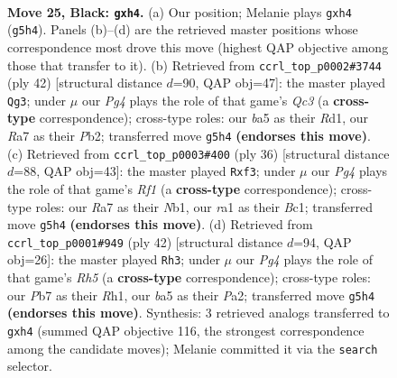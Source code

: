 \documentclass[11pt]{article}
\begin{document}
\clearpage

\begin{figure}[p]\centering
\begin{subfigure}{0.46\textwidth}\centering
\resizebox{\linewidth}{!}{%
\newchessgame
\chessboard[
  setfen={1Nr5/rp2bpk1/p3p3/B5p1/4q2N/4P3/PP3PPP/R2QR1K1 b - - 0 25},
  showmover=false,
  pgfstyle=straightmove, color=movearrow, markmove={g5-h4}
]}
\caption{}
\end{subfigure}\hfill
\begin{subfigure}{0.46\textwidth}\centering
\resizebox{\linewidth}{!}{%
\newchessgame
\chessboard[
  setfen={r2q1rk1/3b1ppp/1p1p4/1N6/p1P2R2/PnQ5/1P2B1PP/3R2K1 w - - 0 22},
  showmover=false,
  pgfstyle=straightmove, color=movearrow, markmove={c3-g3}
]}
\caption{}
\end{subfigure}
\\[4pt]
\begin{subfigure}{0.46\textwidth}\centering
\resizebox{\linewidth}{!}{%
\newchessgame
\chessboard[
  setfen={r2q1rk1/pp4np/3pb1p1/8/2PQPP2/5p2/PP5P/RNB2R1K w - - 0 19},
  showmover=false,
  pgfstyle=straightmove, color=movearrow, markmove={f1-f3}
]}
\caption{}
\end{subfigure}\hfill
\begin{subfigure}{0.46\textwidth}\centering
\resizebox{\linewidth}{!}{%
\newchessgame
\chessboard[
  setfen={2r2rk1/ppq2pp1/7p/4p1bR/4P3/2PB4/PP3QPP/1K5R w - - 0 22},
  showmover=false,
  pgfstyle=straightmove, color=movearrow, markmove={h5-h3}
]}
\caption{}
\end{subfigure}
\caption{\textbf{Move 25, Black: \texttt{gxh4}.} (a) Our position; Melanie plays \texttt{gxh4} (\texttt{g5h4}). Panels (b)--(d) are the retrieved master positions whose correspondence most drove this move (highest QAP objective among those that transfer to it). (b) Retrieved from \texttt{ccrl\_top\_p0002\#3744} (ply 42) [structural distance $d$=90, QAP obj=47]: the master played \texttt{Qg3}; under $\mu$ our \emph{Pg4} plays the role of that game's \emph{Qc3} (a \textbf{cross-type} correspondence); cross-type roles: our \emph{b}a5 as their \emph{R}d1, our \emph{R}a7 as their \emph{P}b2; transferred move \texttt{g5h4} \textbf{(endorses this move)}. (c) Retrieved from \texttt{ccrl\_top\_p0003\#400} (ply 36) [structural distance $d$=88, QAP obj=43]: the master played \texttt{Rxf3}; under $\mu$ our \emph{Pg4} plays the role of that game's \emph{Rf1} (a \textbf{cross-type} correspondence); cross-type roles: our \emph{R}a7 as their \emph{N}b1, our \emph{r}a1 as their \emph{B}c1; transferred move \texttt{g5h4} \textbf{(endorses this move)}. (d) Retrieved from \texttt{ccrl\_top\_p0001\#949} (ply 42) [structural distance $d$=94, QAP obj=26]: the master played \texttt{Rh3}; under $\mu$ our \emph{Pg4} plays the role of that game's \emph{Rh5} (a \textbf{cross-type} correspondence); cross-type roles: our \emph{P}b7 as their \emph{R}h1, our \emph{b}a5 as their \emph{P}a2; transferred move \texttt{g5h4} \textbf{(endorses this move)}. Synthesis: 3 retrieved analogs transferred to \texttt{gxh4} (summed QAP objective 116, the strongest correspondence among the candidate moves); Melanie committed it via the \texttt{search} selector.}
\label{fig:thought-m49}
\end{figure}
\end{document}
